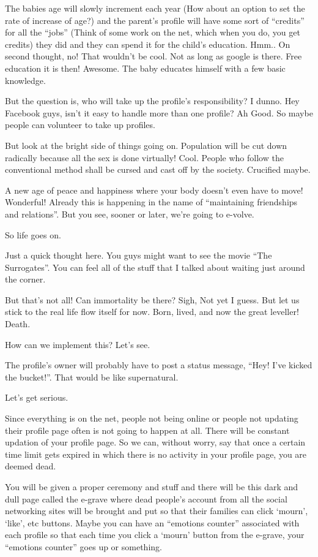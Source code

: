\documentclass[twoside,11pt,titlepage]{article}
\begin{document}
The babies age will slowly increment each year (How about an option to set the rate of increase of age?) and the parent's profile will have some sort of ``credits'' for all the ``jobs'' (Think of some work on the net, which when you do, you get credits) they did and they can spend it for the child's education. Hmm.. On second thought, no! That wouldn't be cool. Not as long as google is there. Free education it is then! Awesome. The baby educates himself with a few basic knowledge.

But the question is, who will take up the profile's responsibility? I dunno. Hey Facebook guys, isn't it easy to handle more than one profile? Ah Good. So maybe people can volunteer to take up profiles.

But look at the bright side of things going on. Population will be cut down radically because all the sex is done virtually! Cool. People who follow the conventional method shall be cursed and cast off by the society. Crucified maybe.

A new age of peace and happiness where your body doesn't even have to move! Wonderful! Already this is happening in the name of ``maintaining friendships and relations''. But you see, sooner or later, we're going to e-volve.

So life goes on.

Just a quick thought here. You guys might want to see the movie ``The Surrogates''. You can feel all of the stuff that I talked about waiting just around the corner.

But that's not all! Can immortality be there? Sigh, Not yet I guess. But let us stick to the real life flow itself for now. Born, lived, and now the great leveller! Death.

How can we implement this? Let's see.

The profile's owner will probably have to post a status message, ``Hey! I've kicked the bucket!''. That would be like supernatural.

Let's get serious.

Since everything is on the net, people not being online or people not updating their profile page often is not going to happen at all. There will be constant updation of your profile page. So we can, without worry, say that once a certain time limit gets expired in which there is no activity in your profile page, you are deemed dead.

You will be given a proper ceremony and stuff and there will be this dark and dull page called the e-grave where dead people's account from all the social networking sites will be brought and put so that their families can click `mourn', `like', etc buttons. Maybe you can have an ``emotions counter'' associated with each profile so that each time you click a `mourn' button from the e-grave, your ``emotions counter'' goes up or something.
\end{document}
